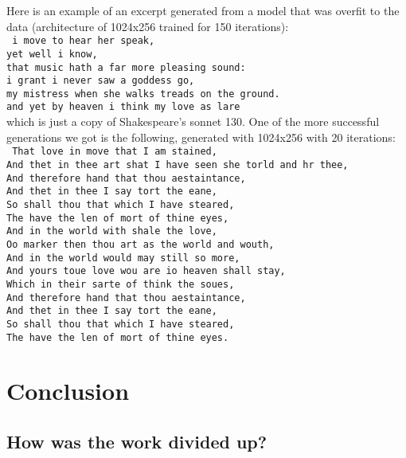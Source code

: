 \indent Here is an example of an excerpt generated from a model that was overfit to the data (architecture of 1024x256 trained for 150 iterations): \\
\texttt{
    i move to hear her speak, \\
    yet well i know, \\
    that music hath a far more pleasing sound: \\
    i grant i never saw a goddess go, \\
    my mistress when she walks treads on the ground. \\
    and yet by heaven i think my love as lare \\
} 
which is just a copy of Shakespeare's sonnet 130. One of the more successful generations we got is the following, generated with 1024x256 with 20 iterations: \\
\texttt{
    That love in move that I am stained, \\
    And thet in thee art shat I have seen she torld and hr thee, \\
    And therefore hand that thou aestaintance, \\
    And thet in thee I say tort the eane, \\
    So shall thou that which I have steared, \\
    The have the len of mort of thine eyes, \\
    And in the world with shale the love, \\
    Oo marker then thou art as the world and wouth, \\
    And in the world would may still so more, \\
    And yours toue love wou are io heaven shall stay, \\
    Which in their sarte of think the soues, \\
    And therefore hand that thou aestaintance, \\
    And thet in thee I say tort the eane, \\
    So shall thou that which I have steared, \\
    The have the len of mort of thine eyes. \\
}


\section{Conclusion}
\medskip

\subsection{How was the work divided up?}
